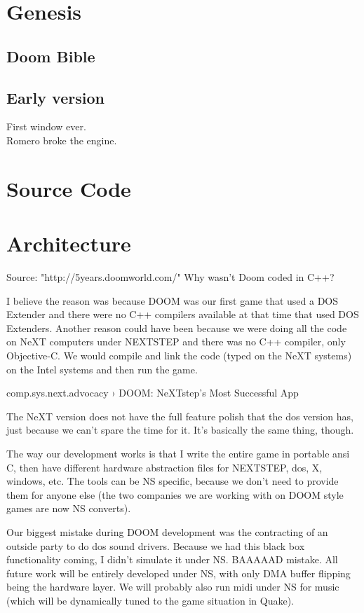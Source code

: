 \section{Genesis}
\subsection{Doom Bible}
\subsection{Early version}
First window ever.\\
Romero broke the engine.\\

\section{Source Code}

\section{Architecture}


Source: "http://5years.doomworld.com/"
Why wasn't Doom coded in C++?
 
I believe the reason was because DOOM was our first game that used a DOS Extender and there were no C++ compilers available at that time that used DOS Extenders.  Another reason could have been because we were doing all the code on NeXT computers under NEXTSTEP and there was no C++ compiler, only Objective-C.  We would compile and link the code (typed on the NeXT systems) on the Intel systems and then run the game.




comp.sys.next.advocacy ›
DOOM: NeXTstep's Most Successful App

The NeXT version does not have the full  
feature polish that the dos version has, just because we can't spare  
the time for it.  It's basically the same thing, though.

The way our development works is that I write the entire game in  
portable ansi C, then have different hardware abstraction files for  
NEXTSTEP, dos, X, windows, etc.  The tools can be NS specific, because  
we don't need to provide them for anyone else (the two companies we are  
working with on DOOM style games are now NS converts).

Our biggest mistake during DOOM development was the contracting of an  
outside party to do dos sound drivers.  Because we had this black box  
functionality coming, I didn't simulate it under NS.  BAAAAAD mistake.   
All future work will be entirely developed under NS, with only DMA  
buffer flipping being the hardware layer.  We will probably also run  
midi under NS for music (which will be dynamically tuned to the game  
situation in Quake).